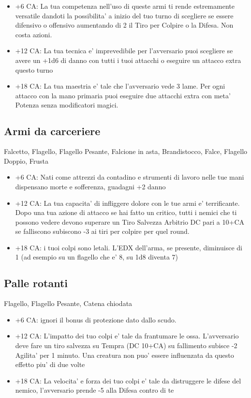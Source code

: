 \documentclass[a4paper,11pt,twoside,openany]{book}
\begin{document}
\begin{itemize}
\item +6 CA: La tua competenza nell'uso di queste armi ti rende estremamente versatile dandoti la possibilita' a inizio del tuo turno di scegliere se essere difensivo o offensivo aumentando di 2 il Tiro per Colpire o la Difesa. Non costa azioni.

\item +12 CA: La tua tecnica e' imprevedibile per l'avversario puoi scegliere se avere un +1d6 di danno con tutti i tuoi attacchi o eseguire un attacco extra questo turno

\item +18 CA: La tua maestria e' tale che l'avversario vede 3 lame. Per ogni attacco con la mano primaria puoi eseguire due attacchi extra con meta' Potenza senza modificatori magici.
\end{itemize}

\subsection{Armi da carceriere} Falcetto, Flagello, Flagello Pesante, Falcione in asta, Brandistocco, Falce, Flagello Doppio, Frusta

\begin{itemize}
\item +6 CA: Nati come attrezzi da contadino e strumenti di lavoro nelle tue mani dispensano morte e sofferenza, guadagni +2 danno

\item +12 CA: La tua capacita' di infliggere dolore con le tue armi e' terrificante. Dopo una tua azione di attacco se hai fatto un critico, tutti i nemici che ti possono vedere devono superare un Tiro Salvezza Arbitrio DC pari a 10+CA se falliscono subiscono -3 ai tiri per colpire per quel round.

\item +18 CA: i tuoi colpi sono letali. L'EDX dell'arma, se presente, diminuisce di 1 (ad esempio su un flagello che e' 8, su 1d8 diventa 7)
\end{itemize}

\subsection{Palle rotanti} Flagello, Flagello Pesante, Catena chiodata

\begin{itemize}
\item +6 CA: ignori il bonus di protezione dato dallo scudo.

\item +12 CA: L'impatto dei tuo colpi e' tale da frantumare le ossa. L'avversario deve fare un tiro salvezza su Tempra (DC 10+CA) su fallimento subisce -2 Agilita' per 1 minuto. Una creatura non puo' essere influenzata da questo effetto piu' di due volte

\item +18 CA: La velocita' e forza dei tuo colpi e' tale da distruggere le difese del nemico, l'avversario prende -5 alla Difesa contro di te 
\end{itemize}
\end{document}
